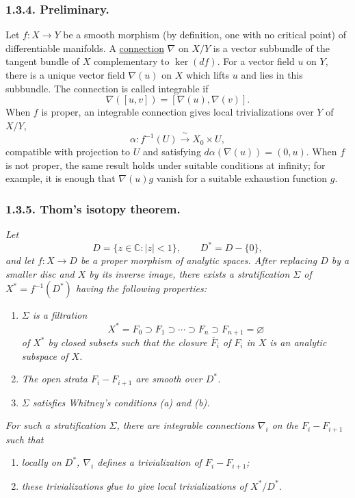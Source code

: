 \subsubsection*{1.3.4. Preliminary.}
Let $f:X\longrightarrow Y$ be a smooth morphism (by definition, one
with no critical point) of differentiable manifolds.  A
\underline{connection} $\nabla$ on $X/Y$ is a vector subbundle of the
tangent bundle of $X$ complementary to $\ker(df)$.  For a vector
field $u$ on $Y$, there is a unique vector field $\nabla(u)$ on $X$
which lifts $u$ and lies in this subbundle.  The connection is called
integrable if
\[
\nabla([u,v])=[\nabla(u),\nabla(v)].
\]
When $f$ is proper, an integrable connection gives local
trivializations over $Y$ of $X/Y$,
\[
\alpha:f^{-1}(U)\xrightarrow{\ \sim\ }X_0\times U,
\]
compatible with projection to $U$ and satisfying
$d\alpha(\nabla(u))=(0,u)$.  When $f$ is not proper, the same result
holds under suitable conditions at infinity; for example, it is
enough that $\nabla(u)g$ vanish for a suitable exhaustion function
$g$.

\subsubsection*{1.3.5. Thom's isotopy theorem.}
\textit{Let
\[
D=\{z\in\mathbb C:|z|<1\},
\qquad D^*=D-\{0\},
\]
and let $f:X\longrightarrow D$ be a proper morphism of analytic
spaces.  After replacing $D$ by a smaller disc and $X$ by its inverse
image, there exists a stratification $\Sigma$ of
$X^*=f^{-1}(D^*)$ having the following properties:}

\begin{enumerate}[label=(\alph*),leftmargin=2.7em]
\item \textit{$\Sigma$ is a filtration
\[
X^*=F_0\supset F_1\supset\cdots\supset F_n
\supset F_{n+1}=\varnothing
\]
of $X^*$ by closed subsets such that the closure $\overline F_i$ of
$F_i$ in $X$ is an analytic subspace of $X$.}

\item \textit{The open strata $F_i-F_{i+1}$ are smooth over $D^*$.}

\item \textit{$\Sigma$ satisfies Whitney's conditions (a) and (b).}
\end{enumerate}

\textit{For such a stratification $\Sigma$, there are integrable
connections $\nabla_i$ on the $F_i-F_{i+1}$ such that}

\begin{enumerate}[label=(\roman*),leftmargin=2.7em]
\item \textit{locally on $D^*$, $\nabla_i$ defines a trivialization
of $F_i-F_{i+1}$;}

\item \textit{these trivializations glue to give local
trivializations of $X^*/D^*$.}
\end{enumerate}

